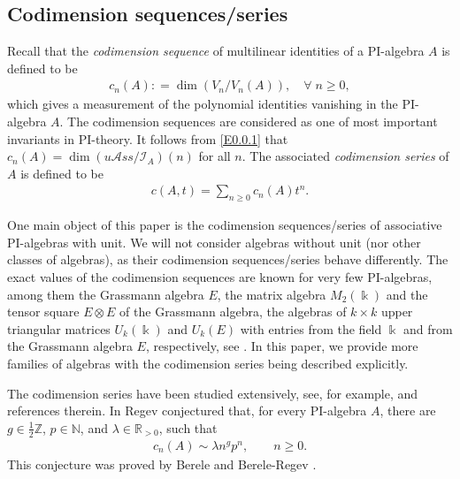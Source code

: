 \documentclass{amsart}
\theoremstyle{definition}
\theoremstyle{remark}
\numberwithin{equation}{section}
\def \uas{u\mathcal{A}ss}
\def \I{\mathcal{I}}
\def \dim{\operatorname{dim}}
\begin{document}
\subsection{Codimension sequences/series}
\label{yysec0.3}
Recall that the {\it codimension sequence} of multilinear identities of a PI-algebra $A$ is defined to be 
\begin{align*}
c_n(A)\colon =\dim (V_n/V_n(A)), \quad \forall \; n\geq 0,
\end{align*}
which gives a measurement of the polynomial identities vanishing in the PI-algebra $A$. 
The codimension sequences are considered as one of most important invariants in PI-theory. 
It follows from \eqref{E0.0.1} that $c_n(A)=\dim (\uas/\I_A)(n)$ for all $n$. 
The associated {\it codimension series} of $A$ is defined to be 
\begin{align*}
c(A,t)=\sum_{n\geq 0} c_n(A)t^n.
\end{align*}

One main object of this paper is the codimension sequences/series of associative PI-algebras with unit. 
We will not consider algebras without unit (nor other classes of algebras), 
as their codimension sequences/series behave differently. 
The exact values of the codimension sequences are known for very few PI-algebras, 
among them the Grassmann algebra $E$, 
the matrix algebra $M_2(\Bbbk)$ and the tensor square $E\otimes E$ of the Grassmann algebra, 
the algebras of $k\times k$ upper triangular matrices $U_k(\Bbbk)$ and $U_k(E)$ with entries from the field $\Bbbk$ 
and from the Grassmann algebra $E$, respectively, see \cite[Examples 9-13]{BD}. 
In this paper, we provide more families of algebras with the codimension series being described explicitly. 

The codimension series have been studied extensively, see, for example, 
\cite{AGPR, AJK, Be, BR, BR2, BD, DrR, GMP, GMZ, GZ1, GZ2, GZ3, GZ4, GZ5, GZ6, IKM, Ma} and references therein. 
In \cite{Re} Regev conjectured that, for every PI-algebra $A$, there are $g\in \frac{1}{2}{\mathbb Z}$, $p\in {\mathbb N}$, 
and $\lambda\in {\mathbb R}_{>0}$, such that
\begin{align}
\label{E0.0.2}\tag{E0.0.2}
c_n(A)\sim \lambda n^{g} p^n,\qquad  n\geq 0.
\end{align}
This conjecture was proved by Berele \cite{Be} and Berele-Regev \cite{BR}. 
\end{document}
